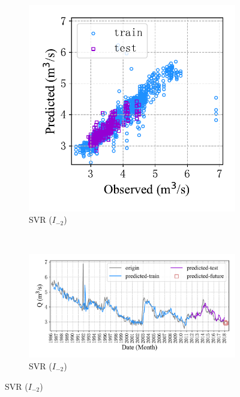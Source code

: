 \begin{figure}[!htbp]
\begin{subfigure}[b]{0.615\textwidth}
  \end{subfigure}
  \\
  \begin{subfigure}[b]{0.305\textwidth}
    \includegraphics[width=\textwidth]{Img/chap4_spr/out4/spr_scatter_in_2_out_4_svr.pdf}
    \vspace{-1.2cm}
    \caption{SVR ($I_{-2}$)}
    \label{fig:spr_scatter_in_2_out_4_svr}
  \end{subfigure}
  ~
  \begin{subfigure}[b]{0.615\textwidth}
    \includegraphics[width=\textwidth]{Img/chap4_spr/out4/spr_series_in_2_out_4_svr.pdf}
    \vspace{-1.2cm}
    \caption{SVR ($I_{-2}$)}
    \label{fig:spr_series_in_2_out_4_svr}

\end{subfigure}
\end{figure}
